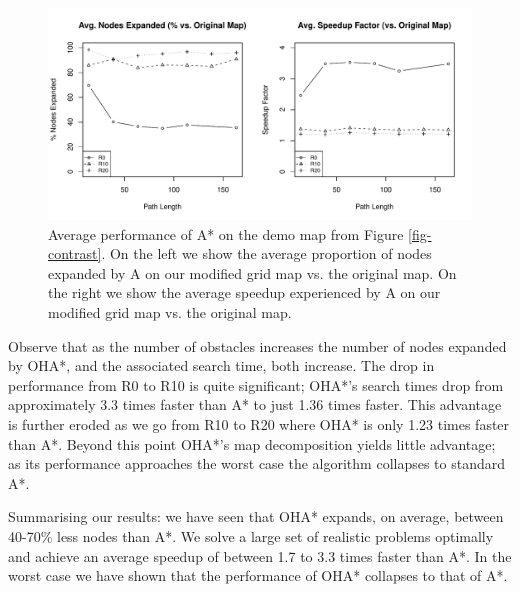 \begin{figure}[t]
	\begin{center}
		       \includegraphics[width=0.9\columnwidth, trim = 20mm 17mm 20mm 5mm]{diagrams/csc2f_performance.pdf}
	\end{center}
	\caption{Average performance of A* on the demo map from Figure \ref{fig-contrast}. On the left
	we show the average proportion of nodes expanded by A\* on our modified grid map vs. the original map.
	On the right we show the average speedup experienced by A\* on our modified grid map vs. the original map. 
	}
\label{fig-csc2fresults}
\end{figure}


Observe that as the number of obstacles increases the number of nodes expanded by OHA*, and the
associated search time, both increase. 
The drop in performance from R0 to R10 is quite significant; OHA*'s search times drop
from approximately 3.3 times faster than A* to just 1.36 times faster.
This advantage is further eroded as we go from R10 to R20 where OHA* is only 
1.23 times faster than A*.
Beyond this point OHA*'s map decomposition yields little advantage; 
as its performance approaches the worst case the algorithm collapses
to standard A*.
\par
Summarising our results: we have seen that OHA* expands, on average, between 40-70\% less nodes than A*.
We solve a large set of realistic problems optimally and achieve an average speedup of between 1.7 to 
3.3 times faster than A*.
In the worst case we have shown that the performance of OHA* collapses to that of A*.
